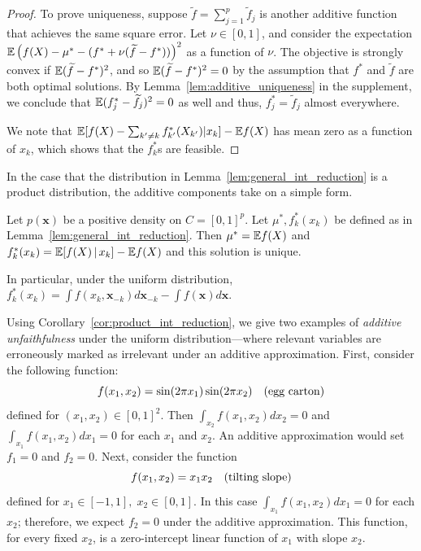 \begin{proof}
To prove uniqueness, suppose $\tilde{f} = \sum_{j=1}^p \tilde{f}_j$ is
another additive function that achieves the same square error. Let
$\nu \in [0,1]$, and consider the expectation ${\mathbb E}\left( f(X) - \mu^* - (f^* + \nu
(\widetilde{f} - f^*)) \right)^2$ as a function of $\nu$. The objective is
strongly convex if ${\mathbb E} (\widetilde{f} - f^*)^2$, and so ${\mathbb E}( \widetilde{f} -
f^*)^2 = 0$ by the assumption that $f^*$ and $\tilde{f}$ are both
optimal solutions. By Lemma~\ref{lem:additive_uniqueness} in the supplement, we conclude
that ${\mathbb E}( f^*_j - \widetilde{f}_j )^2 = 0$ as well and thus, $f^*_j =
\tilde{f}_j$ almost everywhere.

We note that ${\mathbb E}[ f(X) -\sum_{k'\neq k} f^*_{k'}(X_{k'}) | x_k] - {\mathbb E}
f(X)$ has mean zero as a function of $x_k$, which shows that the $f^*_k$s
are feasible.
\end{proof} 

In the case that the distribution in
Lemma~\ref{lem:general_int_reduction} is a product distribution, 
the additive components take on a simple form.

\begin{corollary}
\label{cor:product_int_reduction}
Let $p(\mathbf{x})$ be a positive density on $C=[0,1]^p$.
Let $\mu^*, f^*_k(x_k)$ be defined as in Lemma~\ref{lem:general_int_reduction}.
Then $\mu^* = {\mathbb E} f(X)$ and $f^*_k(x_k) = {\mathbb E}[ f(X) {\,|\,} x_k] - {\mathbb E} f(X)$ and this solution is unique.
\end{corollary}

In particular, under the uniform distribution, $f^*_k(x_k) = \displaystyle\int f(x_k, \mathbf{x}_{-k}) d\mathbf{x}_{-k} - \int f(\mathbf{x}) d\mathbf{x}$.


\begin{example} Using Corollary~\ref{cor:product_int_reduction}, we
  give two examples of \emph{additive unfaithfulness} under the
  uniform distribution---where relevant variables are
  erroneously marked as irrelevant under an additive
  approximation. First, consider the following function:
\begin{equation}
f(x_1, x_2) = \sin( 2\pi x_1) \sin( 2 \pi x_2)\quad
\textrm{(egg carton)} 
\end{equation}
defined for $(x_1, x_2) \in [0,1]^2$.  Then
$\displaystyle\int_{x_2} f(x_1, x_2) d x_2 = 0$ and
$\displaystyle\int_{x_1} f(x_1, x_2) d x_1 = 0$ for each $x_1$ and $x_2$. An additive approximation
would set $f_1 = 0$ and $f_2 = 0$.  Next, consider the function
\begin{equation}
f(x_1, x_2) = x_1 x_2 \quad \textrm{(tilting slope)} 
\end{equation}
defined for $x_1 \in [-1,1],\; x_2 \in [0,1]$.  In this case
$\displaystyle\int_{x_1} f(x_1, x_2) d x_1 = 0$ for each $x_2$; therefore, we expect $f_2 = 0$ under the additive approximation. This function, for every fixed $x_2$, is a zero-intercept linear function of $x_1$ with slope $x_2$.
\end{example}

